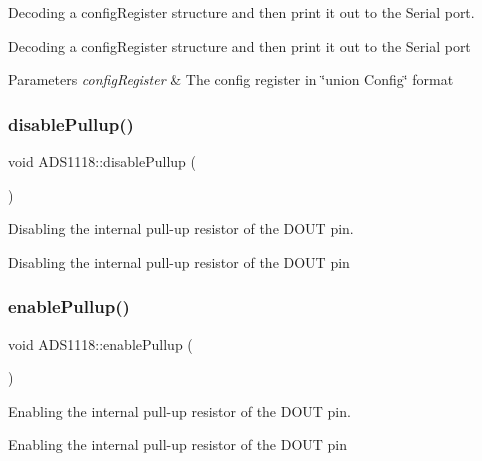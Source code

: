 Decoding a config\+Register structure and then print it out to the Serial port. 

Decoding a config\+Register structure and then print it out to the Serial port 
\begin{DoxyParams}{Parameters}
{\em config\+Register} & The config register in \char`\"{}union Config\char`\"{} format \\
\hline
\end{DoxyParams}
\mbox{\label{class_a_d_s1118_a649c53bdf46a93b5ab682d04b9f9df5e}} 
\subsubsection{\texorpdfstring{disable\+Pullup()}{disablePullup()}}
{\footnotesize\ttfamily void A\+D\+S1118\+::disable\+Pullup (\begin{DoxyParamCaption}{ }\end{DoxyParamCaption})}



Disabling the internal pull-\/up resistor of the D\+O\+UT pin. 

Disabling the internal pull-\/up resistor of the D\+O\+UT pin \mbox{\label{class_a_d_s1118_a833326b882b86608d62450fcedabbe4a}} 
\subsubsection{\texorpdfstring{enable\+Pullup()}{enablePullup()}}
{\footnotesize\ttfamily void A\+D\+S1118\+::enable\+Pullup (\begin{DoxyParamCaption}{ }\end{DoxyParamCaption})}



Enabling the internal pull-\/up resistor of the D\+O\+UT pin. 

Enabling the internal pull-\/up resistor of the D\+O\+UT pin \mbox{\label{class_a_d_s1118_adf872650d20977b5872f88fa36182d3a}} 
